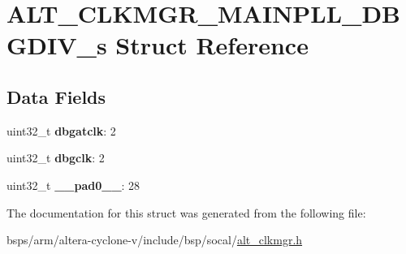 \hypertarget{structALT__CLKMGR__MAINPLL__DBGDIV__s}{}\section{A\+L\+T\+\_\+\+C\+L\+K\+M\+G\+R\+\_\+\+M\+A\+I\+N\+P\+L\+L\+\_\+\+D\+B\+G\+D\+I\+V\+\_\+s Struct Reference}
\label{structALT__CLKMGR__MAINPLL__DBGDIV__s}
\subsection*{Data Fields}
\begin{DoxyCompactItemize}
\item 
\mbox{\label{structALT__CLKMGR__MAINPLL__DBGDIV__s_aa7f750748302ed24b0dab4dc5f0a68b4}} 
uint32\+\_\+t {\bfseries dbgatclk}\+: 2
\item 
\mbox{\label{structALT__CLKMGR__MAINPLL__DBGDIV__s_a9680a9253d981d2119a2c7eb4db9ccfa}} 
uint32\+\_\+t {\bfseries dbgclk}\+: 2
\item 
\mbox{\label{structALT__CLKMGR__MAINPLL__DBGDIV__s_af8a3ccd4686fd40d3649887577119739}} 
uint32\+\_\+t {\bfseries \+\_\+\+\_\+pad0\+\_\+\+\_\+}\+: 28
\end{DoxyCompactItemize}


The documentation for this struct was generated from the following file\+:\begin{DoxyCompactItemize}
\item 
bsps/arm/altera-\/cyclone-\/v/include/bsp/socal/\mbox{\hyperlink{alt__clkmgr_8h}{alt\+\_\+clkmgr.\+h}}\end{DoxyCompactItemize}
